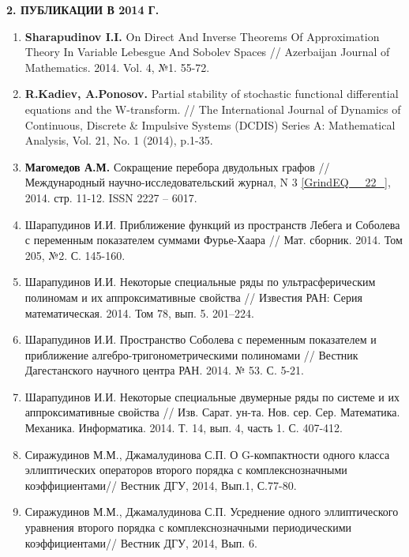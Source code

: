 \textbf{2. ПУБЛИКАЦИИ В 2014 Г.}

\noindent

\begin{enumerate}
\item  \textbf{Sharapudinov I.I. }On Direct And Inverse Theorems Of Approximation Theory In Variable Lebesgue And Sobolev Spaces // Azerbaijan Journal of Mathematics. 2014. Vol. 4, №1. 55-72.

\item  \textbf{R.Kadiev, A.Ponosov. }Partial stability of stochastic functional differential equations and the W-transform. // The International Journal of Dynamics of Continuous, Discrete \& Impulsive Systems (DCDIS) Series A: Mathematical Analysis, Vol. 21, No. 1 (2014), p.1-35.

\item  \textbf{Магомедов А.М. }Сокращение перебора двудольных графов // Международный научно-исследовательский журнал, N 3 \eqref{GrindEQ__22_}, 2014. стр. 11-12. ISSN 2227 -- 6017.

\item  Шарапудинов И.И. Приближение функций из пространств Лебега и Соболева с переменным показателем суммами Фурье-Хаара // Мат. сборник. 2014. Том 205, №2. С. 145-160.

\item  Шарапудинов И.И.\textbf{ }Некоторые специальные ряды по ультрасферическим полиномам и их аппроксимативные свойства // Известия РАН: Серия математическая. 2014. Том 78, вып. 5. 201--224.

\item  Шарапудинов И.И.\textbf{ }Пространство Соболева с переменным показателем и приближение алгебро-тригонометрическими полиномами // Вестник Дагестанского научного центра РАН. 2014. № 53. С. 5-21.

\item  Шарапудинов И.И.\textbf{ }Некоторые специальные двумерные ряды по системе  и их аппроксимативные свойства // Изв. Сарат. ун-та. Нов. сер. Сер. Математика. Механика. Информатика. 2014. Т. 14, вып. 4, часть 1. С. 407-412.

\item  Сиражудинов М.М.,\textbf{ }Джамалудинова С.П.\textbf{ }О G-компактности одного класса эллиптических операторов второго порядка с комплекснозначными коэффициентами// Вестник ДГУ, 2014, Вып.1, С.77-80.

\item  Сиражудинов М.М., Джамалудинова С.П.\textbf{ }Усреднение одного эллиптического уравнения второго порядка с комплекснозначными периодическими коэффициентами// Вестник ДГУ, 2014, Вып. 6.


\end{enumerate}

